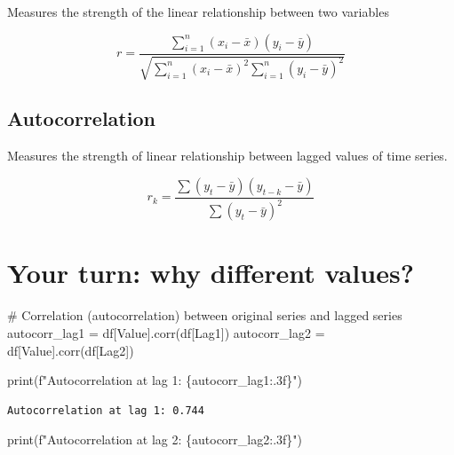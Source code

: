 \documentclass[
  11pt,
  a4paper,
]{report}
\newenvironment{Shaded}{\begin{snugshade}}{\end{snugshade}}
\newcommand{\BuiltInTok}[1]{\textcolor[rgb]{0.00,0.23,0.31}{#1}}
\newcommand{\CommentTok}[1]{\textcolor[rgb]{0.37,0.37,0.37}{#1}}
\newcommand{\NormalTok}[1]{\textcolor[rgb]{0.00,0.23,0.31}{#1}}
\newcommand{\OperatorTok}[1]{\textcolor[rgb]{0.37,0.37,0.37}{#1}}
\newcommand{\SpecialCharTok}[1]{\textcolor[rgb]{0.37,0.37,0.37}{#1}}
\newcommand{\SpecialStringTok}[1]{\textcolor[rgb]{0.13,0.47,0.30}{#1}}
\newcommand{\StringTok}[1]{\textcolor[rgb]{0.13,0.47,0.30}{#1}}
\begin{document}
Measures the strength of the linear relationship between two variables

\[r = \frac{\sum_{i=1}^{n} (x_i -\bar{x})(y_i-\bar{y})}{\sqrt{\sum_{i=1}^{n} (x_i -\bar{x})^2 \sum_{i=1}^{n} (y_i -\bar{y})^2}}\]

\subsection{Autocorrelation}\label{autocorrelation}

Measures the strength of linear relationship between lagged values of
time series.

\[r_k = \frac{\sum (y_t -\bar{y})(y_{t-k}-\bar{y})}{\sum (y_t -\bar{y})^2}\]

\section{Your turn: why different
values?}\label{your-turn-why-different-values}

\begin{Shaded}
\begin{Highlighting}[]
\CommentTok{\# Correlation (autocorrelation) between original series and lagged series}
\NormalTok{autocorr\_lag1 }\OperatorTok{=}\NormalTok{ df[}\StringTok{\textquotesingle{}Value\textquotesingle{}}\NormalTok{].corr(df[}\StringTok{\textquotesingle{}Lag1\textquotesingle{}}\NormalTok{])}
\NormalTok{autocorr\_lag2 }\OperatorTok{=}\NormalTok{ df[}\StringTok{\textquotesingle{}Value\textquotesingle{}}\NormalTok{].corr(df[}\StringTok{\textquotesingle{}Lag2\textquotesingle{}}\NormalTok{])}

\BuiltInTok{print}\NormalTok{(}\SpecialStringTok{f"Autocorrelation at lag 1: }\SpecialCharTok{\{}\NormalTok{autocorr\_lag1}\SpecialCharTok{:.3f\}}\SpecialStringTok{"}\NormalTok{)}
\end{Highlighting}
\end{Shaded}

\begin{verbatim}
Autocorrelation at lag 1: 0.744
\end{verbatim}

\begin{Shaded}
\begin{Highlighting}[]
\BuiltInTok{print}\NormalTok{(}\SpecialStringTok{f"Autocorrelation at lag 2: }\SpecialCharTok{\{}\NormalTok{autocorr\_lag2}\SpecialCharTok{:.3f\}}\SpecialStringTok{"}\NormalTok{)}
\end{Highlighting}
\end{Shaded}
\end{document}
